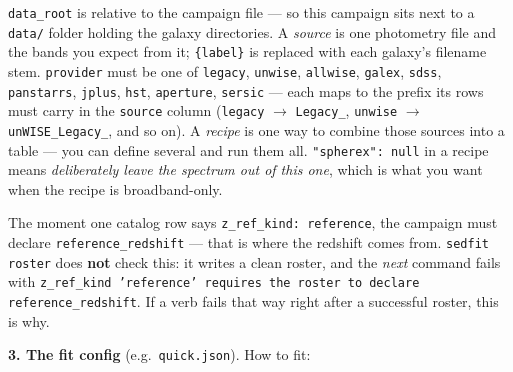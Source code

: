 \documentclass[11pt]{article}
\begin{document}
\texttt{data\_root} is relative to the campaign file --- so this campaign
sits next to a \texttt{data/} folder holding the galaxy directories. A
\emph{source} is one photometry file and the bands you expect from it;
\texttt{\{label\}} is replaced with each galaxy's filename stem.
\texttt{provider} must be one of \texttt{legacy}, \texttt{unwise},
\texttt{allwise}, \texttt{galex}, \texttt{sdss}, \texttt{panstarrs},
\texttt{jplus}, \texttt{hst}, \texttt{aperture}, \texttt{sersic} --- each
maps to the prefix its rows must carry in the \texttt{source} column
(\texttt{legacy} $\rightarrow$ \texttt{Legacy\_}, \texttt{unwise}
$\rightarrow$ \texttt{unWISE\_Legacy\_}, and so on). A \emph{recipe} is one way
to combine those sources into a table --- you can define several and run
them all. \texttt{"spherex": null} in a recipe means \emph{deliberately
leave the spectrum out of this one}, which is what you want when the
recipe is broadband-only.

\begin{warnbox}
The moment one catalog row says \texttt{z\_ref\_kind: reference}, the
campaign must declare \texttt{reference\_redshift} --- that is where the
redshift comes from. \texttt{sedfit roster} does \textbf{not} check
this: it writes a clean roster, and the \emph{next} command fails with
\texttt{z\_ref\_kind 'reference' requires the roster to declare
reference\_redshift}. If a verb fails that way right after a successful
roster, this is why.
\end{warnbox}

\textbf{3. The fit config} (e.g.\ \texttt{quick.json}). How to fit:
\end{document}
